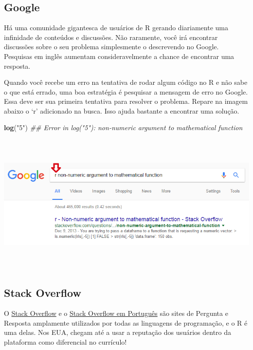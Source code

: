 \documentclass[]{book}
\newenvironment{Shaded}{\begin{snugshade}}{\end{snugshade}}
\newcommand{\CommentTok}[1]{\textcolor[rgb]{0.56,0.35,0.01}{\textit{#1}}}
\newcommand{\KeywordTok}[1]{\textcolor[rgb]{0.13,0.29,0.53}{\textbf{#1}}}
\newcommand{\NormalTok}[1]{#1}
\newcommand{\StringTok}[1]{\textcolor[rgb]{0.31,0.60,0.02}{#1}}
\begin{document}
\hypertarget{google}{%
\subsection{Google}\label{google}}

Há uma comunidade gigantesca de usuários de R gerando diariamente uma infinidade de conteúdos e discussões. Não raramente, você irá encontrar discussões sobre o seu problema simplesmente o descrevendo no Google. Pesquisas em inglês aumentam consideravelmente a chance de encontrar uma resposta.

Quando você recebe um erro na tentativa de rodar algum código no R e não sabe o que está errado, uma boa estratégia é pesquisar a mensagem de erro no Google. Essa deve ser sua primeira tentativa para resolver o problema. Repare na imagem abaixo o `r' adicionado na busca. Isso ajuda bastante a encontrar uma solução.

\begin{Shaded}
\begin{Highlighting}[]
\KeywordTok{log}\NormalTok{(}\StringTok{"5"}\NormalTok{)}
\CommentTok{## Error in log("5"): non-numeric argument to mathematical function}
\end{Highlighting}
\end{Shaded}

\begin{center}\includegraphics[width=795,height=267]{img/r-base/ajuda_google} \end{center}

\hypertarget{stack-overflow}{%
\subsection{Stack Overflow}\label{stack-overflow}}

O \href{http://stackoverflow.com/}{Stack Overflow} e o \href{http://pt.stackoverflow.com/}{Stack Overflow em Português} são sites de Pergunta e Resposta amplamente utilizados por todas as linguagens de programação, e o R é uma delas. Nos EUA, chegam até a usar a reputação dos usuários dentro da plataforma como diferencial no currículo!
\end{document}
